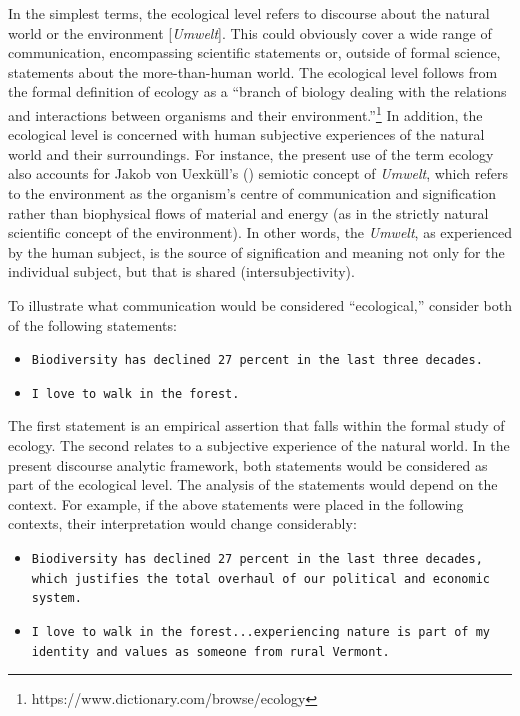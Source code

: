 In the simplest terms, the ecological level refers to discourse about the natural world or the environment [\textit{Umwelt}]. This could obviously cover a wide range of communication, encompassing scientific statements or, outside of formal science, statements about the more-than-human world. The ecological level follows from the formal definition of ecology as a ``branch of biology dealing with the relations and interactions between organisms and their environment.''\footnote{https://www.dictionary.com/browse/ecology} In addition, the ecological level is concerned with human subjective experiences of the natural world and their surroundings. For instance, the present use of the term ecology also accounts for Jakob von Uexk\"ull's (\citeyear{VonUexkull1982}) semiotic concept of \textit{Umwelt}, which refers to the environment as the organism's centre of communication and signification rather than biophysical flows of material and energy (as in the strictly natural scientific concept of the environment). In other words, the \textit{Umwelt}, as experienced by the human subject, is the source of signification and meaning not only for the individual subject, but that is shared (intersubjectivity).

To illustrate what communication would be considered ``ecological,'' consider both of the following statements:

\begin{footnotesize}
\begin{itemize}
    \item[-] \texttt{Biodiversity has declined 27 percent in the last three decades.}
    \item[-] \texttt{I love to walk in the forest.}
\end{itemize}
\end{footnotesize}

The first statement is an empirical assertion that falls within the formal study of ecology. The second relates to a subjective experience of the natural world. In the present discourse analytic framework, both statements would be considered as part of the ecological level. The analysis of the statements would depend on the context. For example, if the above statements were placed in the following contexts, their interpretation would change considerably:

\begin{footnotesize}
\begin{itemize}
    \item[-] \texttt{Biodiversity has declined 27 percent in the last three decades, which justifies the total overhaul of our political and economic system.}
    \item[-] \texttt{I love to walk in the forest...experiencing nature is part of my identity and values as someone from rural Vermont.}
\end{itemize}
\end{footnotesize}

